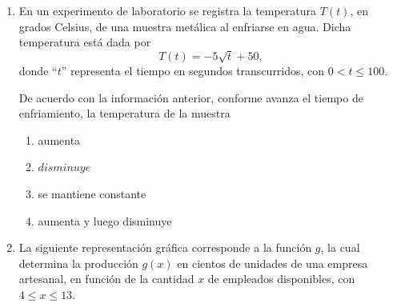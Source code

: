\documentclass[11pt]{article}
\newcommand{\opcion}[2]{\item $#2$}
\begin{document}
\begin{enumerate}[label=\textbf{\arabic*.}, itemsep=2.5cm]
De acuerdo con la informaci\'on anterior, si la turbina produce 12 kilovatios, \textquestiondown cu\'al es la velocidad del viento en m/s?

\begin{enumerate}[label=\Alph*)]
  \item $13$
  \item $15$
  \opcion{C}{17}
  \item $19$
\end{enumerate}

\Needspace{0.42\textheight}
\item
En un experimento de laboratorio se registra la temperatura $T(t)$, en grados Celsius, de una muestra met\'alica al enfriarse en agua. Dicha temperatura est\'a dada por
\[T(t)=-5\sqrt{t}+50,\]
donde ``$t$'' representa el tiempo en segundos transcurridos, con $0 < t \leq 100$.

De acuerdo con la informaci\'on anterior, conforme avanza el tiempo de enfriamiento, la temperatura de la muestra

\begin{enumerate}[label=\Alph*)]
  \item aumenta
  \opcion{B}{disminuye}
  \item se mantiene constante
  \item aumenta y luego disminuye
\end{enumerate}

\Needspace{0.78\textheight}
\item
La siguiente representaci\'on gr\'afica corresponde a la funci\'on $g$, la cual determina la producci\'on $g(x)$ en cientos de unidades de una empresa artesanal, en funci\'on de la cantidad $x$ de empleados disponibles, con $4 \leq x \leq 13$.

\begin{center}
\end{center}


\end{enumerate}
\end{document}
